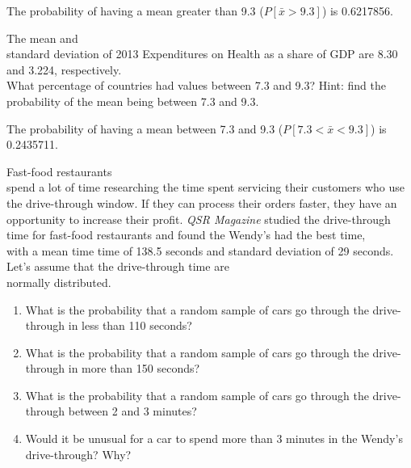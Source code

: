 \documentclass[11pt]{book}\usepackage[]{graphicx}\usepackage[]{color}
\begin{document}
\begin{exercises}
\begin{exercise}
	  \end{exercise}
	  \vspace{2cm}
	  \begin{solution}    %



    The probability of having a mean greater than 9.3 ($P[ \bar{x} > 9.3 ]$) is 0.6217856.

	\end{solution}

  		\begin{exercise}  %

	  The mean and \\ standard  deviation of 2013 Expenditures on Health as a share of GDP are 8.30 and 3.224, respectively.  \\ What percentage of countries had values between 7.3 and 9.3?   Hint: find the probability of the mean being between 7.3 and  9.3.

	  \end{exercise}
	  \begin{solution}    %



    The probability of having a mean between 7.3 and  9.3 ($P[ 7.3 < \bar{x} < 9.3 ]$) is 0.2435711.

	\end{solution}
	
\begin{exercise}   %



Fast-food restaurants \\ spend a lot of time researching the time spent servicing their customers who use the drive-through window.  If they can process their orders faster, they have an opportunity to increase their profit.  \textit{QSR Magazine} studied the drive-through time for fast-food restaurants and found the Wendy's had the best time, \\ with a mean  time time of 138.5 seconds and standard deviation of 29 seconds.  Let's assume that the drive-through time are \\ normally distributed. 

\begin{enumerate}
\item What is the  probability that a random sample of cars go through the drive- \\ through in less than 110 seconds?
\item What is the  probability that a random sample of cars go through the drive- \\ through in more than 150 seconds?
\item What is the  probability that a random sample of cars go through the drive- \\ through between 2 and 3 minutes?
\item Would it be unusual for a car to spend more than 3 minutes in the Wendy's \\ drive-through?  Why?
\end{enumerate}


\end{exercise}
\end{exercises}
\end{document}
